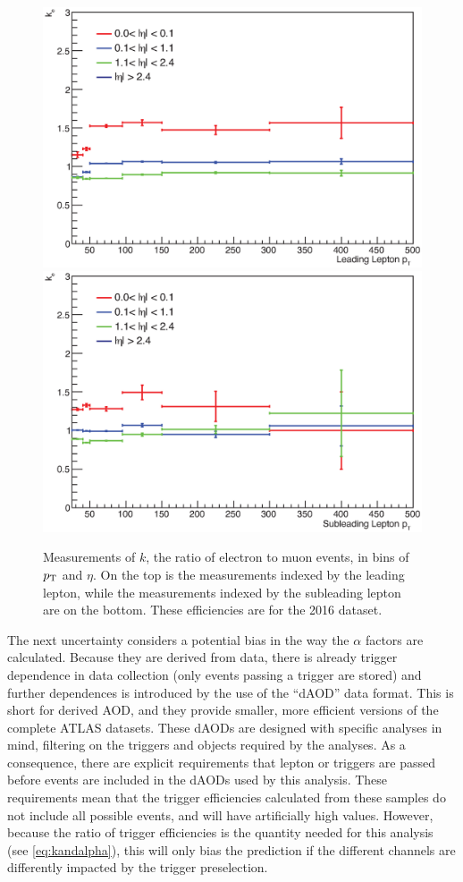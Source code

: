 \begin{centering}
\begin{figure}[bth]
\myfloatalign
\includegraphics[width=.85\linewidth]{figures/fs/data_efficiencies_2j_Z_lep0.eps}
\includegraphics[width=.85\linewidth]{figures/fs/data_efficiencies_2j_Z_lep1.eps}
\caption{Measurements of $k$, the ratio of electron to muon events, in bins of $p_{\text{T}}$ and $\eta$. On the top is the measurements indexed by the leading lepton, while the measurements indexed by the subleading lepton are on the bottom. These efficiencies are for the 2016 dataset.}
\label{fig:fs_k}
\end{figure}
\end{centering}

The next uncertainty considers a potential bias in the way the $\alpha$ factors are calculated. Because they are derived from data, there is already trigger dependence in data collection (only events passing a trigger are stored) and further dependences is introduced by the use of the ``dAOD'' data format. This is short for derived \ac{AOD}, and they provide smaller, more efficient versions of the complete ATLAS datasets. These dAODs are designed with specific analyses in mind, filtering on the triggers and objects required by the analyses. As a consequence, there are explicit requirements that lepton or \met triggers are passed before events are included in the dAODs used by this analysis. These requirements mean that the trigger efficiencies calculated from these samples do not include all possible events, and will have artificially high values. However, because the ratio of trigger efficiencies is the quantity needed for this analysis (see \autoref{eq:kandalpha}), this will only bias the prediction if the different channels are differently impacted by the trigger preselection.

